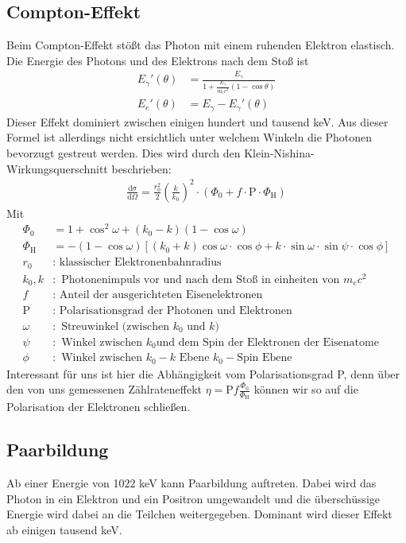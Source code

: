 \documentclass[twoside,colorback,accentcolor=tud4c,11pt]{tudreport}
\begin{document}
\subsection{Compton-Effekt}
Beim Compton-Effekt stößt das Photon mit einem ruhenden Elektron elastisch. Die Energie des Photons und des Elektrons nach dem Stoß ist 
\begin{align}
E_\gamma'(\theta)&=\frac{E_\gamma}{1+\frac{E_\gamma}{m_ec^2}(1-\cos\theta)}\\
E_e'(\theta)&=E_\gamma-E_\gamma'(\theta)
\end{align}
Dieser Effekt dominiert zwischen einigen hundert und tausend keV. Aus dieser Formel ist allerdings nicht ersichtlich unter welchem Winkeln die Photonen bevorzugt gestreut werden. Dies wird durch den Klein-Nishina-Wirkungsquerschnitt beschrieben:
\begin{align}
\frac{\text{d}\sigma}{\text{d}\Omega}=\frac{r_0^2}{2}\left(\frac{k}{k_0}\right)^2\cdot\left(\Phi_0+f\cdot\text{P}\cdot\Phi_\text{H}\right)
\end{align}
Mit 
\begin{align*}
\Phi_0&=1+\cos^2\omega+(k_0-k)(1-\cos\omega)\\
\Phi_\text{H}&=-(1-\cos\omega)[(k_0+k)\cos\omega\cdot\cos\phi+k\cdot\sin\omega\cdot\sin\psi\cdot\cos\phi]\\
r_0&:\text{ klassischer Elektronenbahnradius}\\
k_0,k&:\text{ Photonenimpuls vor und nach dem Stoß in einheiten von }m_ec^2\\
f&:\text{ Anteil der ausgerichteten Eisenelektronen}\\
\text{P}&:\text{ Polarisationsgrad der Photonen und Elektronen}\\
\omega&:\text{ Streuwinkel (zwischen }k_0\text{ und }k)\\
\psi&:\text{ Winkel zwischen }k_0\text{und dem Spin der Elektronen der Eisenatome}\\
\phi&:\text{ Winkel zwischen }k_0-k\text{ Ebene }k_0-\text{Spin Ebene}
\end{align*}
Interessant für uns ist hier die Abhängigkeit vom Polarisationsgrad P, denn über den von uns gemessenen Zählrateneffekt $\eta=\text{P}f\frac{\Phi_0}{\Phi_\text{H}}$ können wir so auf die Polarisation der Elektronen schließen.
\subsection{Paarbildung}
Ab einer Energie von 1022 keV kann Paarbildung auftreten. Dabei wird das Photon in ein Elektron und ein Positron umgewandelt und die überschüssige Energie wird dabei an die Teilchen weitergegeben. Dominant wird dieser Effekt ab einigen tausend keV.
\end{document}
